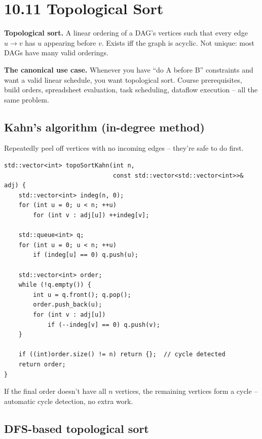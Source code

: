 \documentclass[11pt]{article}
\begin{document}
\section{10.11 Topological Sort}

\begin{defnbox}
\textbf{Topological sort.} A linear ordering of a DAG's vertices such that every edge $u \to v$ has $u$ appearing before $v$. Exists iff the graph is acyclic. Not unique: most DAGs have many valid orderings.
\end{defnbox}

\begin{ideabox}
\textbf{The canonical use case.} Whenever you have ``do A before B'' constraints and want a valid linear schedule, you want topological sort. Course prerequisites, build orders, spreadsheet evaluation, task scheduling, dataflow execution -- all the same problem.
\end{ideabox}

\subsection*{Kahn's algorithm (in-degree method)}

Repeatedly peel off vertices with no incoming edges -- they're safe to do first.

\begin{lstlisting}[basicstyle=\ttfamily\small,frame=single]
std::vector<int> topoSortKahn(int n,
                              const std::vector<std::vector<int>>& adj) {
    std::vector<int> indeg(n, 0);
    for (int u = 0; u < n; ++u)
        for (int v : adj[u]) ++indeg[v];

    std::queue<int> q;
    for (int u = 0; u < n; ++u)
        if (indeg[u] == 0) q.push(u);

    std::vector<int> order;
    while (!q.empty()) {
        int u = q.front(); q.pop();
        order.push_back(u);
        for (int v : adj[u])
            if (--indeg[v] == 0) q.push(v);
    }

    if ((int)order.size() != n) return {};  // cycle detected
    return order;
}
\end{lstlisting}

If the final order doesn't have all $n$ vertices, the remaining vertices form a cycle -- automatic cycle detection, no extra work.

\subsection*{DFS-based topological sort}
\end{document}
